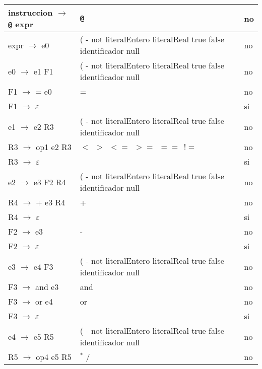 \documentclass[11pt]{article}
\begin{document}
\begin{longtable}{|p{6cm}|p{4cm}|p{3cm}|}
                instruccion $\rightarrow$ \verb|@| expr & \verb|@| & no \\
                \hline
                expr $\rightarrow$ e0 & ( - not literalEntero literalReal true false identificador null & no \\
                \hline
                e0 $\rightarrow$ e1 F1 & ( - not literalEntero literalReal true false identificador null & no \\
                \hline
                F1 $\rightarrow$ = e0 & = & no \\
                \hline
                F1 $\rightarrow$ $\varepsilon$ &  & si \\
                \hline
                e1 $\rightarrow$ e2 R3 & ( - not literalEntero literalReal true false identificador null & no \\
                \hline
                R3 $\rightarrow$ op1 e2 R3 & $< \ \ > \ \ <= \ \ >= \ \ == \ \  !=$ & no \\
                \hline
                R3 $\rightarrow$ $\varepsilon$ &  & si \\
                \hline
                e2 $\rightarrow$ e3 F2 R4 & ( - not literalEntero literalReal true false identificador null & no \\
                \hline
                R4 $\rightarrow$ + e3 R4 & + & no \\
                \hline
                R4 $\rightarrow$ $\varepsilon$ &  & si \\
                \hline
                F2 $\rightarrow$ e3 & - & no \\
                \hline
                F2 $\rightarrow$ $\varepsilon$ &  & si \\
                \hline
                e3 $\rightarrow$ e4 F3 & ( - not literalEntero literalReal true false identificador null & no \\
                \hline
                F3 $\rightarrow$ and e3 & and & no \\
                \hline
                F3 $\rightarrow$ or e4 & or & no \\
                \hline
                F3 $\rightarrow$ $\varepsilon$ &  & si \\
                \hline
                e4 $\rightarrow$ e5 R5 & ( - not literalEntero literalReal true false identificador null & no \\
                \hline
                R5 $\rightarrow$ op4 e5 R5 & $^{\ast}$ / & no \\

\end{longtable}
\end{document}
